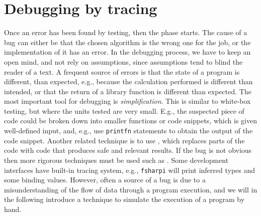 \begin{comment}
  http://www.scientificamerican.com/article/pogue-5-most-embarrassing-software-bugs-in-history/, 5 Most Embarrassing Software Bugs in History

  http://royal.pingdom.com/2009/03/19/10-historical-software-bugs-with-extreme-consequences/

  https://raygun.com/blog/2014/05/10-costly-software-errors-history/

  http://www.computerworld.com/article/2515483/enterprise-applications/epic-failures--11-infamous-software-bugs.html

  http://catless.ncl.ac.uk/Risks/20.59.html#subj1

  https://en.wikipedia.org/wiki/List_of_software_bugs

  December 19, 1991; ISO/IEC 9126, the international standard for the evaluation of software quality, replaced by ISO/IEC 25010:2011. Not publicly available, \footnote{A review of the ISO/IEC 9126 is given in \url{http://www.sqa.net/iso9126.html}. A brief review of ISO/IEC 25010:2011 is given in }
\end{comment}

\section{Debugging by tracing}
Once an error has been found by testing, then the  phase starts. The cause of a bug can either be that the chosen algorithm is the wrong one for the job, or the implementation of it has an error. In the debugging process, we have to keep an open mind, and not rely on assumptions, since assumptions tend to blind the reader of a text. A frequent source of errors is that the state of a program is different, than expected, e.g., because the calculation performed is different than intended, or that the return of a library function is different than expected. The most important tool for debugging is \emph{simplification}. This is similar to white-box testing, but where the units tested are very small. E.g., the suspected piece of code could be broken down into smaller functions or code snippets, which is given well-defined input, and, e.g., use \lstinline!printfn! statements to obtain the output of the code snippet. Another related technique is to use , which replaces parts of the code with code that produces safe and relevant results. If the bug is not obvious then more rigorous techniques must be used such as . Some development interfaces have built-in tracing system, e.g., \lstinline[language=console]{fsharpi} will print inferred types and some binding values. However, often a source of a bug is due to a misunderstanding of the flow of data through a program execution, and we will in the following introduce  a technique to simulate the execution of a program by hand.

